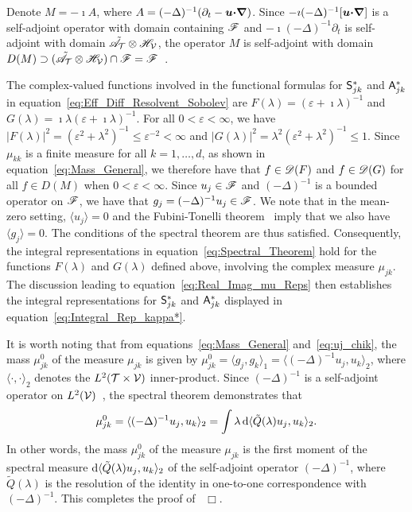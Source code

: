 \documentclass[amsa]{ipart}
\begin{document}
Denote $M=-\imath A$, where $A=(-\Delta)^{-1}(\partial_t-\boldsymbol{u}\mbox{\boldmath${\cdot}$}\mbox{\boldmath${\nabla}$})$. Since
$-\imath(-\Delta)^{-1}[\boldsymbol{u}\mbox{\boldmath${\cdot}$}\mbox{\boldmath${\nabla}$}]$ is a self-adjoint
operator with domain containing $\mathscr{F}$ and 
$-\imath(-\Delta)^{-1}\partial_t$ is self-adjoint with domain
$\tilde{\mathscr{A}}_{\mathcal{T}}\otimes\mathscr{H}_{\mathcal{V}}$, the operator $M$ is self-adjoint with 
domain $D(M)\supset(\tilde{\mathscr{A}}_{\mathcal{T}}\otimes\mathscr{H}_{\mathcal{V}})\cap\mathscr{F}=\mathscr{F}$~\cite{Stone:64}.




The
complex-valued functions involved in the functional formulas for
$\mathsf{S}^*_{jk}$ and $\mathsf{A}^*_{jk}$ in
equation~\eqref{eq:Eff_Diff_Resolvent_Sobolev} are $F(\lambda)=(\varepsilon+\imath\lambda)^{-1}$
and $G(\lambda)=\imath\lambda(\varepsilon+\imath\lambda)^{-1}$. For all $0<\varepsilon<\infty$, 
we have $|F(\lambda)|^2=(\varepsilon^2+\lambda^2)^{-1}\leq\varepsilon^{-2}<\infty$ and 
$|G(\lambda)|^2=\lambda^2(\varepsilon^2+\lambda^2)^{-1}\leq 1$. Since $\mu_{kk}$ is a finite measure
for all $k=1,\ldots,d$, as shown in equation~\eqref{eq:Mass_General}, we
therefore have 
that $f\in\mathscr{D}(F)$ and $f\in\mathscr{D}(G)$ for all $f\in D(M)$ when $0<\varepsilon<\infty$. Since $u_j\in\mathscr{F}$ and $(-\Delta)^{-1}$ is a bounded operator on $\mathscr{F}$, we have that 
$g_j=(-\Delta)^{-1}u_j\in\mathscr{F}$. We note that in the mean-zero setting,
$\langle u_j\rangle=0$ and the Fubini-Tonelli theorem~\cite{Folland:99:RealAnalysis} 
imply that we also have $\langle g_j\rangle=0$. The conditions of the spectral
theorem are thus satisfied. Consequently, the integral representations in
equation~\eqref{eq:Spectral_Theorem} hold for the functions $F(\lambda)$ and
$G(\lambda)$ defined above, involving the complex measure $\mu_{jk}$. The
discussion leading to equation~\eqref{eq:Real_Imag_mu_Reps} then
establishes the integral representations for $\mathsf{S}^*_{jk}$ and
$\mathsf{A}^*_{jk}$ displayed in equation~\eqref{eq:Integral_Rep_kappa*}.



It is worth noting that from
equations~\eqref{eq:Mass_General} and~\eqref{eq:uj_chik}, the mass
$\mu_{jk}^0$ of the measure $\mu_{jk}$ is given by
$\mu_{jk}^0=\langle g_j,g_k\rangle_1=\langle(-\Delta)^{-1}u_j,u_k\rangle_2$, where $\langle\cdot,\cdot\rangle_2$ denotes
the $L^2(\mathcal{T}\times\mathcal{V})$ inner-product. Since
$(-\Delta)^{-1}$ is a self-adjoint operator on
$L^2(\mathcal{V})$~\cite{Stakgold:BVP:2000}, the spectral theorem demonstrates
that  
%
\begin{align}\label{eq:Laplacian_moment}
  \mu_{jk}^0=\langle(-\Delta)^{-1}u_j,u_k\rangle_2=\int\lambda\,\d\langle\tilde{Q}(\lambda)u_j,u_k\rangle_2.
\end{align}
%
In other words, the mass $\mu_{jk}^0$ of the measure $\mu_{jk}$ is the first moment
of the spectral measure $\mathrm{d}\langle\tilde{Q}(\lambda)u_j,u_k\rangle_2$ of the
self-adjoint operator $(-\Delta)^{-1}$, where $\tilde{Q}(\lambda)$ is the
resolution of the identity in one-to-one correspondence with
$(-\Delta)^{-1}$. This completes the proof of~ $\Box$. 
\end{document}
